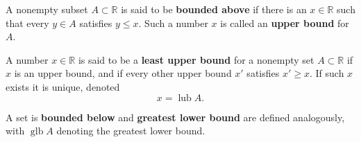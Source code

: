 A nonempty subset $A \subset \mathbb{R}$ is said to be \textbf{bounded above} if there is an $x \in \mathbb{R}$ such that every $y \in A$ satisfies $y \leq x$. Such a number $x$ is called an \textbf{upper bound} for $A$.

A number $x \in \mathbb{R}$ is said to be a \textbf{least upper bound} for a nonempty set $A \subset \mathbb{R}$ if $x$ is an upper bound, and if every other upper bound $x'$ satisfies $x' \geq x$. If such $x$ exists it is unique, denoted
$$x = \operatorname{lub} A.$$

A set is \textbf{bounded below} and \textbf{greatest lower bound} are defined analogously, with $\operatorname{glb} A$ denoting the greatest lower bound.
